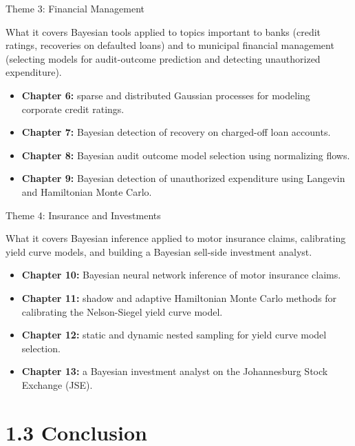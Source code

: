 \documentclass[aspectratio=169,10pt]{beamer}
\begin{document}
\begin{frame}{Theme 3: Financial Management}
  \begin{block}{What it covers}
    Bayesian tools applied to topics important to banks (credit ratings,
    recoveries on defaulted loans) and to municipal financial management
    (selecting models for audit-outcome prediction and detecting
    unauthorized expenditure).
  \end{block}
  \begin{itemize}
    \item \textbf{Chapter 6:} sparse and distributed Gaussian processes for
    modeling corporate credit ratings.
    \item \textbf{Chapter 7:} Bayesian detection of recovery on charged-off
    loan accounts.
    \item \textbf{Chapter 8:} Bayesian audit outcome model selection using
    normalizing flows.
    \item \textbf{Chapter 9:} Bayesian detection of unauthorized expenditure
    using Langevin and Hamiltonian Monte Carlo.
  \end{itemize}
\end{frame}

\begin{frame}{Theme 4: Insurance and Investments}
  \begin{block}{What it covers}
    Bayesian inference applied to motor insurance claims, calibrating yield
    curve models, and building a Bayesian sell-side investment analyst.
  \end{block}
  \begin{itemize}
    \item \textbf{Chapter 10:} Bayesian neural network inference of motor
    insurance claims.
    \item \textbf{Chapter 11:} shadow and adaptive Hamiltonian Monte Carlo
    methods for calibrating the Nelson-Siegel yield curve model.
    \item \textbf{Chapter 12:} static and dynamic nested sampling for yield
    curve model selection.
    \item \textbf{Chapter 13:} a Bayesian investment analyst on the
    Johannesburg Stock Exchange (JSE).
  \end{itemize}
\end{frame}

\section{1.3 Conclusion}
\end{document}
